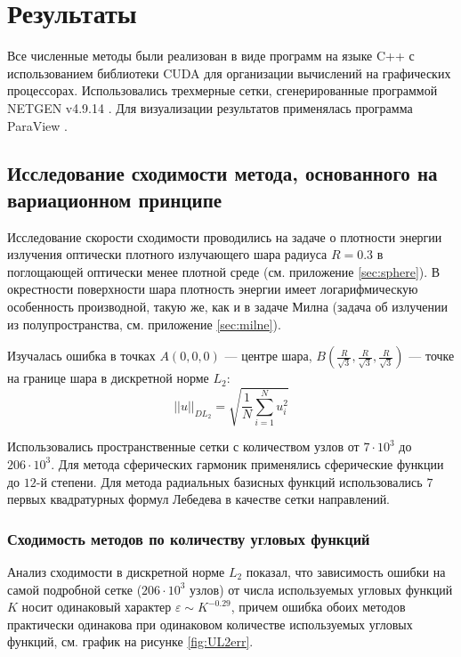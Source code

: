 \chapter{Результаты}

Все численные методы были реализован в виде программ на языке C++ с использованием библиотеки CUDA \cite{cuda2015} для организации вычислений на графических процессорах. Использовались трехмерные сетки, сгенерированные программой NETGEN v4.9.14 \cite{Netgen2009}.
Для визуализации результатов применялась программа ParaView \cite{Paraview2004}.

\section{Исследование сходимости метода, основанного на вариационном принципе}

Исследование скорости сходимости проводились на задаче о плотности энергии излучения оптически плотного излучающего шара радиуса $R = 0.3$ в поглощающей оптически менее плотной среде (см. приложение \ref{sec:sphere}). В окрестности поверхности шара плотность энергии имеет логарифмическую особенность производной, такую же, как и в задаче Милна (задача об излучении из полупространства, см. приложение \ref{sec:milne}).

Изучалась ошибка в точках $A(0, 0, 0)$ --- центре шара, $B\left(\frac{R}{\sqrt{3}}, \frac{R}{\sqrt{3}}, \frac{R}{\sqrt{3}}\right)$ --- точке на границе шара в дискретной норме $L_2$:
\[
||u||_{DL_2} = \sqrt{\frac{1}{N}\sum_{i=1}^N u_i^2}
\]

Использовались пространственные сетки с количеством узлов от $7 \cdot 10^3$ до $206 \cdot 10^3$. Для метода сферических гармоник применялись сферические функции до $12$-й степени. Для метода радиальных базисных функций использовались $7$ первых квадратурных формул Лебедева в качестве сетки направлений. 

\subsection{Сходимость методов по количеству угловых функций}

Анализ сходимости в дискретной норме $L_2$ показал, что зависимость ошибки на самой подробной сетке ($206 \cdot 10^3$ узлов) от числа используемых угловых функций $K$ носит одинаковый характер $\varepsilon \sim K^{-0.29}$, причем ошибка обоих методов практически одинакова при одинаковом количестве используемых угловых функций, см. график на рисунке \ref{fig:UL2err}.

